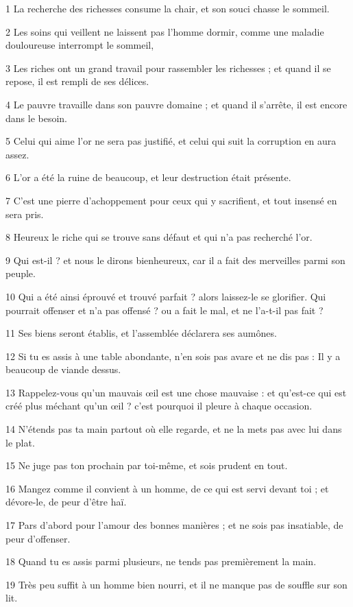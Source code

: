 \par 1 La recherche des richesses consume la chair, et son souci chasse le sommeil.
\par 2 Les soins qui veillent ne laissent pas l'homme dormir, comme une maladie douloureuse interrompt le sommeil,
\par 3 Les riches ont un grand travail pour rassembler les richesses ; et quand il se repose, il est rempli de ses délices.
\par 4 Le pauvre travaille dans son pauvre domaine ; et quand il s'arrête, il est encore dans le besoin.
\par 5 Celui qui aime l'or ne sera pas justifié, et celui qui suit la corruption en aura assez.
\par 6 L'or a été la ruine de beaucoup, et leur destruction était présente.
\par 7 C'est une pierre d'achoppement pour ceux qui y sacrifient, et tout insensé en sera pris.
\par 8 Heureux le riche qui se trouve sans défaut et qui n'a pas recherché l'or.
\par 9 Qui est-il ? et nous le dirons bienheureux, car il a fait des merveilles parmi son peuple.
\par 10 Qui a été ainsi éprouvé et trouvé parfait ? alors laissez-le se glorifier. Qui pourrait offenser et n’a pas offensé ? ou a fait le mal, et ne l'a-t-il pas fait ?
\par 11 Ses biens seront établis, et l'assemblée déclarera ses aumônes.
\par 12 Si tu es assis à une table abondante, n'en sois pas avare et ne dis pas : Il y a beaucoup de viande dessus.
\par 13 Rappelez-vous qu'un mauvais œil est une chose mauvaise : et qu'est-ce qui est créé plus méchant qu'un œil ? c'est pourquoi il pleure à chaque occasion.
\par 14 N'étends pas ta main partout où elle regarde, et ne la mets pas avec lui dans le plat.
\par 15 Ne juge pas ton prochain par toi-même, et sois prudent en tout.
\par 16 Mangez comme il convient à un homme, de ce qui est servi devant toi ; et dévore-le, de peur d'être haï.
\par 17 Pars d'abord pour l'amour des bonnes manières ; et ne sois pas insatiable, de peur d'offenser.
\par 18 Quand tu es assis parmi plusieurs, ne tends pas premièrement la main.
\par 19 Très peu suffit à un homme bien nourri, et il ne manque pas de souffle sur son lit.
